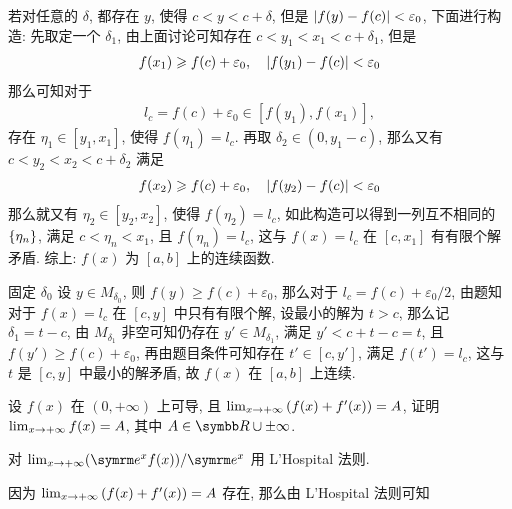 \begin{exercise}[series=exer]
\begin{answer}
\begin{method}
            若对任意的 $ \delta $, 都存在 $ y $, 使得 $ c < y < c + \delta $, 但是 $ \abs{f(y) - f(c)} < \varepsilon_{0} $, 下面进行构造: 先取定一个 $ \delta_{1} $, 由上面讨论可知存在 $ c < y_{1} < x_{1} < c + \delta_{1}  $, 但是
            \begin{align*}
                f(x_{1}) \geqslant f(c) + \varepsilon_{0}, \quad \abs{f(y_{1}) - f(c)} < \varepsilon_{0}
            \end{align*}
            那么可知对于
            \begin{align*}
                l_{c} = f(c) + \varepsilon_{0} \in [f(y_{1}), f(x_{1})],
            \end{align*}
            存在 $ \eta_{1} \in [y_{1}, x_{1}] $, 使得 $ f(\eta_{1}) = l_{c} $. 再取 $ \delta_{2} \in (0, y_{1} - c) $, 那么又有 $ c < y_{2} < x_{2} < c + \delta_{2} $ 满足
            \begin{align*}
                f(x_{2}) \geqslant f(c) + \varepsilon_{0}, \quad \abs{f(y_{2}) - f(c)} < \varepsilon_{0}
            \end{align*}
            那么就又有 $ \eta_{2} \in [y_{2}, x_{2}] $, 使得 $ f(\eta_{2}) = l_{c} $, 如此构造可以得到一列互不相同的 $ \qty{\eta_{n}} $, 满足 $ c < \eta_{n} < x_{1} $, 且 $ f(\eta_{n}) = l_{c} $, 这与 $ f(x) = l_{c} $ 在 $ [c, x_{1}] $ 有有限个解矛盾. 综上: $ f(x) $ 为 $ [a, b] $ 上的连续函数.
            \item 固定 $ \delta_{0} $ 设 $ y \in M_{\delta_{0}} $, 则 $ f(y) \ge f(c) + \varepsilon_{0} $, 那么对于 $ l_{c} = f(c) + \varepsilon_{0}/2 $, 由题知对于 $ f(x) = l_{c} $ 在 $ [c, y] $ 中只有有限个解, 设最小的解为 $ t > c $, 那么记 $ \delta_{1} = t - c $, 由 $ M_{\delta_{1}} $ 非空可知仍存在 $ y' \in M_{\delta_{1}} $, 满足 $ y' < c + t - c = t $, 且 $ f(y') \ge f(c) + \varepsilon_{0} $, 再由题目条件可知存在 $ t' \in [c, y'] $, 满足 $ f(t') = l_{c} $, 这与 $ t $ 是 $ [c, y] $ 中最小的解矛盾, 故 $ f(x) $ 在 $ [a, b] $ 上连续. 
        \end{method}
    \end{answer}
    \item 设 $ f(x) $ 在 $ (0, +\infty) $ 上可导, 且 $ \lim_{x \to +\infty} \qty(f(x) + f'(x)) = A $, 证明 $ \lim_{x \to +\infty} f(x) = A $, 其中 $ A \in \R\cup{\pm\infty} $. 
    \begin{hint}
        对 $ \limit{x}{+\infty} (\me^{x} f(x))/\me^{x} $ 用 L'Hospital 法则. 
    \end{hint}
    \begin{answer}
        因为 $ \lim_{x \to +\infty} \qty(f(x) + f'(x)) = A $ 存在, 那么由 L'Hospital 法则可知

\end{answer}
\end{exercise}
